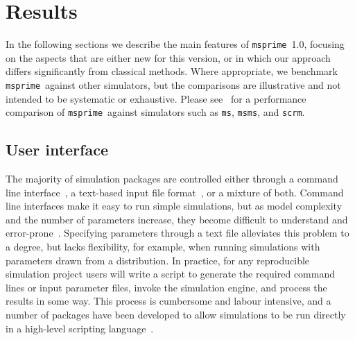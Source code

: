 \documentclass{article}
\newcommand{\msprime}[0]{\texttt{msprime}}
\newcommand{\ms}[0]{\texttt{ms}}
\newcommand{\msms}[0]{\texttt{msms}}
\newcommand{\scrm}[0]{\texttt{scrm}}
\begin{document}

\section*{Results}
In the following sections we describe the main features of \msprime\ 1.0,
focusing on the aspects that are either new for this version, or in which
our approach differs significantly from classical methods. Where appropriate,
we benchmark \msprime\ against other simulators, but the comparisons are
illustrative and not intended to be systematic or exhaustive. Please
see~\cite{kelleher2016efficient} for a performance comparison of
\msprime\ against simulators such as \ms, \msms, and \scrm.


\subsection*{User interface}
\label{sec-sim-interface}

The majority of simulation packages are controlled either through
a command line interface~\citep[e.g.][]{hudson2002generating,kern2016discoal},
a text-based input file
format~\citep[e.g.][]{guillaume2006nemo,excoffier2011fastsimcoal,shlyakhter2014cosi2},
or a mixture of both.
Command line interfaces make it easy to run simple
simulations, but as model complexity and the number of parameters increase,
they become difficult to understand and
error-prone~\citep{ragsdale2020lessons,gower2021demes}.
Specifying parameters through a text file alleviates this problem to a degree,
but lacks flexibility, for example, when running simulations with parameters
drawn from a distribution. In practice, for any reproducible simulation
project users will write a script
to generate the required command lines or input parameter files,
invoke the simulation engine, and process the results in some way.
This process is cumbersome and labour intensive, and
a number of packages have been developed
to allow simulations to be run directly in a high-level
scripting language~\citep{staab2016coala,parobek2017skelesim,gladstein2018simprily}.
\end{document}
